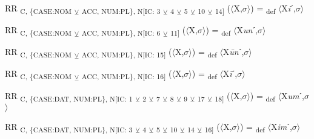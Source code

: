 {\begin{exe}
 RR \textsubscript{C, \{CASE:NOM} \textsubscript{${\veebar}$}\textsubscript{ ACC, NUM:PL\}, N[IC: 3} \textsubscript{${\veebar}$}\textsubscript{ 4} \textsubscript{${\veebar}$}\textsubscript{ 5} \textsubscript{${\veebar}$}\textsubscript{ 10} \textsubscript{${\veebar}$}\textsubscript{ 14]} ($\langle$X,$\sigma $$\rangle$) = \textsubscript{def} $\langle$X\textit{i}ˊ,$\sigma $$\rangle$
\end{exe}

\begin{exe}
 RR \textsubscript{C, \{CASE:NOM} \textsubscript{${\veebar}$}\textsubscript{ ACC, NUM:PL\}, N[IC: 6} \textsubscript{${\veebar}$}\textsubscript{ 11]} ($\langle$X,$\sigma $$\rangle$) = \textsubscript{def} $\langle$X\textit{un}ˊ,$\sigma $$\rangle$
\end{exe}

\begin{exe}
 RR \textsubscript{C, \{CASE:NOM} \textsubscript{${\veebar}$}\textsubscript{ ACC, NUM:PL\}, N[IC: 15]} ($\langle$X,$\sigma $$\rangle$) = \textsubscript{def} $\langle$X\textit{\=un}ˊ,$\sigma $$\rangle$
\end{exe}

\begin{exe}
 RR \textsubscript{C, \{CASE:NOM} \textsubscript{${\veebar}$}\textsubscript{ ACC, NUM:PL\}, N[IC: 16]} ($\langle$X,$\sigma $$\rangle$) = \textsubscript{def} $\langle$X\textit{\=i}ˊ,$\sigma $$\rangle$
\end{exe}

\begin{exe}
 RR \textsubscript{C, \{CASE:DAT, NUM:PL\}, N[IC: 1} \textsubscript{${\veebar}$}\textsubscript{ 2} \textsubscript{${\veebar}$}\textsubscript{ 7} \textsubscript{${\veebar}$}\textsubscript{ 8} \textsubscript{${\veebar}$}\textsubscript{ 9} \textsubscript{${\veebar}$}\textsubscript{ 17} \textsubscript{${\veebar}$}\textsubscript{ 18]} ($\langle$X,$\sigma $$\rangle$) = \textsubscript{def} $\langle$X\textit{um}ˊ,$\sigma $$\rangle$
\end{exe}

\begin{exe}
 RR \textsubscript{C, \{CASE:DAT, NUM:PL\}, N[IC: 3} \textsubscript{${\veebar}$}\textsubscript{ 4} \textsubscript{${\veebar}$}\textsubscript{ 5} \textsubscript{${\veebar}$}\textsubscript{ 10} \textsubscript{${\veebar}$}\textsubscript{ 14} \textsubscript{${\veebar}$}\textsubscript{ 16]} ($\langle$X,$\sigma $$\rangle$) = \textsubscript{def} $\langle$X\textit{im}ˊ,$\sigma $$\rangle$
\end{exe}

}
